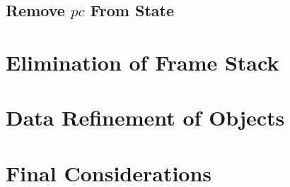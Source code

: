 \subsection{Remove $pc$ From State}
\label{remove-pc-from-state-subsection}

\section{Elimination of Frame Stack}
\label{elimination-of-frame-stack-section}

\section{Data Refinement of Objects}
\label{data-refinement-of-objects-section}

\section{Final Considerations}
\label{compilation-final-considerations-section}